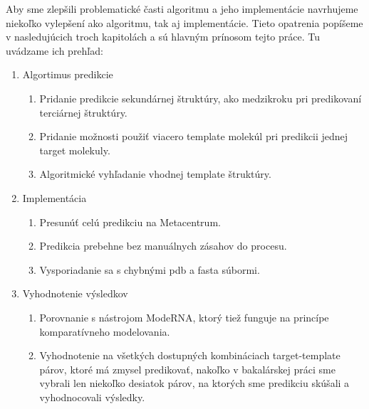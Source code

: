 \indent Aby sme zlepšili problematické časti algoritmu a jeho implementácie navrhujeme niekoľko vylepšení ako algoritmu, tak aj implementácie. Tieto opatrenia popíšeme v nasledujúcich troch kapitolách a sú hlavným prínosom tejto práce. Tu uvádzame ich prehľad:
\begin{enumerate}
\item Algortimus predikcie
\begin{enumerate}
\item Pridanie predikcie sekundárnej štruktúry, ako medzikroku pri predikovaní terciárnej štruktúry.
\item Pridanie možnosti použiť viacero template molekúl pri predikcii jednej target molekuly.
\item Algoritmické vyhľadanie vhodnej template štruktúry.
\end{enumerate}
\item Implementácia
\begin{enumerate}
\item Presunúť celú predikciu na Metacentrum.
\item Predikcia prebehne bez manuálnych zásahov do procesu.
\item Vysporiadanie sa s chybnými pdb a fasta súbormi.
\end{enumerate}
\item Vyhodnotenie výsledkov
\begin{enumerate}
\item Porovnanie s nástrojom ModeRNA, ktorý tiež funguje na princípe komparatívneho modelovania.
\item Vyhodnotenie na všetkých dostupných kombináciach target-template párov, ktoré má zmysel predikovať, nakoľko v bakalárskej práci sme vybrali len niekoľko desiatok párov, na ktorých sme predikciu skúšali a vyhodnocovali výsledky.
\end{enumerate}
\end{enumerate}


